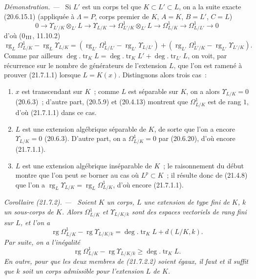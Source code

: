 \documentclass[10pt,oneside]{book}
\makeatletter
\newcommand{\setmanualcurrentlabel}[1]{\def\@currentlabel{#1}}
\newenvironment{corollary}[1][]{%
  \setmanualcurrentlabel{#1}\par\medskip\noindent\itshape Corollaire (#1). ---\ }{\par}
\newenvironment{proof}{%
  \par\medskip\noindent\textit{Démonstration. ---\ }}{\par}
\makeatother
\begin{document}
\begin{proof}
Si $L'$ est un corps tel que $K\subset L'\subset L$, on a la suite exacte
(20.6.15.1) (appliquée à $\Lambda=P$, corps premier de $K$, $A=K$,
$B=L'$, $C=L$)
\[
0\to\Upsilon_{L'/K}\otimes_{L'}L\to\Upsilon_{L/K}
\to\Omega^1_{L'/K}\otimes_{L'}L\to\Omega^1_{L/K}
\to\Omega^1_{L/L'}\to0
\]
d'où (0$_{\rm III}$, 11.10.2)
\[
\operatorname{rg}_L\Omega^1_{L/K}-\operatorname{rg}_L\Upsilon_{L/K}
=(\operatorname{rg}_{L'}\Omega^1_{L/L'}-\operatorname{rg}_{L'}\Upsilon_{L/L'})
+(\operatorname{rg}_{L'}\Omega^1_{L'/K}-\operatorname{rg}_{L'}\Upsilon_{L'/K}).
\]
Comme par ailleurs $\deg.\operatorname{tr}_K L=\deg.\operatorname{tr}_K L'
+\deg.\operatorname{tr}_{L'}L$, on voit, par récurrence sur le nombre de
générateurs de l'extension $L$, que l'on est ramené à prouver (21.7.1.1)
lorsque $L=K(x)$. Distinguons alors trois cas~:
\begin{enumerate}
  \item[\rm a)] $x$ est transcendant sur $K$~; comme $L$ est séparable sur
  $K$, on a alors $\Upsilon_{L/K}=0$ (20.6.3)~; d'autre part, (20.5.9) et
  (20.4.13) montrent que $\Omega^1_{L/K}$ est de rang $1$, d'où
  (21.7.1.1) dans ce cas.
  \item[\rm b)] $L$ est une extension algébrique séparable de $K$, de sorte
  que l'on a encore $\Upsilon_{L/K}=0$ (20.6.3). D'autre part, on a
  $\Omega^1_{L/K}=0$ par (20.6.20), d'où encore (21.7.1.1).
  \item[\rm c)] $L$ est une extension algébrique inséparable de $K$~; le
  raisonnement du début montre que l'on peut se borner au cas où $L^p\subset K$~;
  il résulte donc de (21.4.8) que l'on a
  $\operatorname{rg}_L\Upsilon_{L/K}=\operatorname{rg}_L\Omega^1_{L/K}$,
  d'où encore (21.7.1.1).
\end{enumerate}
\end{proof}

\begin{corollary}[21.7.2]
\label{0.21.7.2-fr}
Soient $K$ un corps, $L$ une extension de type fini de $K$, $k$ un sous-corps
de $K$. Alors $\Omega^1_{L/K}$ et $\Upsilon_{L/K/k}$ sont des espaces
vectoriels de rang fini sur $L$, et l'on a
\begin{equation}
\tag{21.7.2.1}
\label{0.21.7.2.1-fr}
\operatorname{rg}\Omega^1_{L/K}-\operatorname{rg}\Upsilon_{L/K/k}
=\deg.\operatorname{tr}_K L+d(L/K,k).
\end{equation}
Par suite, on a l'inégalité
\begin{equation}
\tag{21.7.2.2}
\label{0.21.7.2.2-fr}
\operatorname{rg}\Omega^1_{L/K}-\operatorname{rg}\Upsilon_{L/K/k}
\geqslant\deg.\operatorname{tr}_K L.
\end{equation}
En outre, pour que les deux membres de (21.7.2.2) soient égaux, il faut et
il suffit que $k$ soit un corps admissible pour l'extension $L$ de $K$.
\end{corollary}
\end{document}
